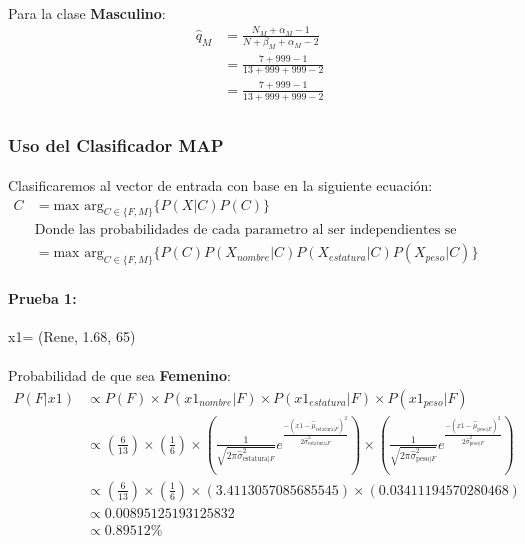 \documentclass[12pt]{article}
\begin{document}
\paragraph{}Para la clase \textbf{Masculino}:
\begin{equation}
\begin{split}
\hat{q}_M &= \frac{N_M + \alpha_M - 1}{N + \beta_M + \alpha_M - 2}\\
&= \frac{7 + 999 - 1}{13 + 999 + 999 - 2}\\
&= \frac{7 + 999 - 1}{13 + 999 + 999 - 2}\\
\end{split}
\end{equation}
\clearpage
\pagebreak
\subsubsection{Uso del Clasificador MAP}
\paragraph{} Clasificaremos al vector de entrada con base en la siguiente ecuación:
\begin{equation}
\begin{split}
C &= \text{max arg}_{C\in\{F,M\}} \{ P(X|C)P(C)\} \\
&\text{Donde las probabilidades de cada parametro al ser independientes se multiplicaran}\\
&= \text{max arg}_{C\in\{F,M\}} \{ P(C) P(X_{nombre}|C)P(X_{estatura}|C)P(X_{peso}|C)\}
\end{split}
\end{equation}
\paragraph{Prueba 1: }x1= (Rene, 1.68, 65)
\paragraph{}Probabilidad de que sea \textbf{Femenino}:\\
\begin{equation}
\begin{split}
P(F|x1) &\propto P(F) \times P(x1_{nombre}|F) \times P(x1_{estatura}|F) \times P(x1_{peso}|F) \\
&\propto (\frac{6}{13}) \times (\frac{1}{6}) \times (\frac{1}{\sqrt{2\pi\hat{\sigma}_{\text{estatura}|F}^2}}e^{\frac{-(x1 - \hat{\mu}_{\text{estatura}|F})^2}{2\hat{\sigma}_{\text{estatura}|F}^2}}) \times (\frac{1}{\sqrt{2\pi\hat{\sigma}_{\text{peso}|F}^2}}e^{\frac{-(x1 - \hat{\mu}_{\text{peso}|F})^2}{2\hat{\sigma}_{\text{peso}|F}^2}}) \\
&\propto (\frac{6}{13}) \times (\frac{1}{6}) \times (3.4113057085685545) \times (0.03411194570280468) \\
&\propto 0.00895125193125832 \\
&\propto 0.89512\% \\
\end{split}
\end{equation}
\end{document}
